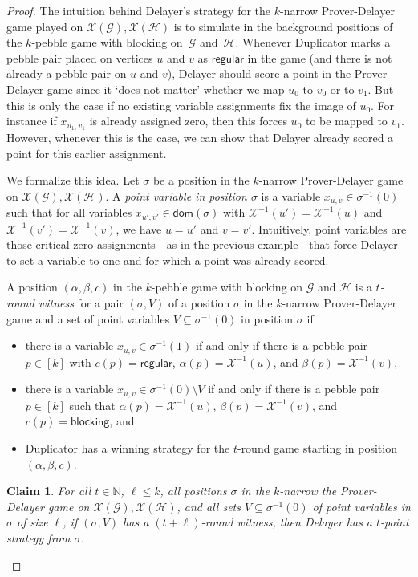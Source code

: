 \documentclass[10pt,a4paper]{article}
\newcommand{\defining}[1]{\emph{#1}}
\newcommand{\regular}{\mathsf{regular}}
\newcommand{\blocking}{\mathsf{blocking}}
\newcommand{\inv}[1]{#1^{-1}}
\newcommand{\graphG}{\mathcal{G}}
\newcommand{\graphH}{\mathcal{H}}
\newcommand{\dom}{\mathsf{dom}}
\newcommand{\graphXG}{\mathcal{X}(\mathcal{G})}
\newcommand{\graphXH}{\mathcal{X}(\mathcal{H})}
\newcommand{\X}{\mathcal{X}}
\newcommand{\XI}{\X^{-1}}
\newtheorem{claim}[theorem]{Claim}
\begin{document}
%
\begin{proof}
The intuition behind Delayer's strategy for the $k$-narrow Prover-Delayer game played on $\graphXG,\graphXH$ is to 
simulate in the background positions of the $k$-pebble game with blocking on~$\graphG$ and~$\graphH$.
Whenever Duplicator marks a pebble pair placed on vertices $u$ and $v$ as $\regular$ in the game
(and there is not already a pebble pair on $u$ and $v$),
Delayer should score a point in the Prover-Delayer game since it `does not matter' whether we map $u_0$ to $v_0$ or to $v_1$.
But this is only the case if no existing variable assignments fix the image of $u_0$. For instance if $x_{u_1,v_1}$ is already assigned zero, then this forces $u_0$ to be mapped to $v_1$. However, whenever this is the case, we can show that Delayer already scored a point for this earlier assignment.

We formalize this idea.
Let $\sigma$ be a position in the $k$-narrow 
Prover-Delayer game on $\graphXG, \graphXH$.
A \defining{point variable in position $\sigma$} is a variable $x_{u,v} \in \inv{\sigma}(0)$ such that
for all variables $x_{u',v'} \in \dom(\sigma)$ with $\XI(u') = \XI(u)$ and $\XI(v') = \XI(v)$, we have $u=u'$ and $v=v'$.
Intuitively, point variables are those critical zero assignments---as in the previous example---that force Delayer to set a variable to one and for which a point was already scored. 

A position $(\alpha,\beta,c)$ in the $k$-pebble game with blocking on $\graphG$ and $\graphH$ is a \defining{$t$-round witness} for
a pair $(\sigma, V)$ of a position $\sigma$ in the $k$-narrow Prover-Delayer game and a set of point variables $V \subseteq \sigma^{-1}(0)$ in position $\sigma$ if
\begin{itemize}
        \item there is a variable $x_{u,v} \in \sigma^{-1}(1)$ if and only if
        there is a pebble pair $p \in [k]$ with $c(p) = \regular$, $\alpha(p) = \XI(u)$, and $\beta(p) = \XI(v)$,
        \item there is a variable  $x_{u,v} \in \sigma^{-1}(0)\setminus V$ if and only if
        there is a pebble pair $p \in [k]$ such that $\alpha(p) = \XI(u)$, $\beta(p) = \XI(v)$, and $c(p) = \blocking$, and
        \item Duplicator has a winning strategy for the $t$-round game starting in position $(\alpha, \beta,c)$. 
\end{itemize}

\begin{claim} \label{claim: witness_implies_points} For all $t \in \mathbb{N}$, $\ell \leq k$, all positions $\sigma$ in the $k$-narrow the Prover-Delayer
game on $\graphXG, \graphXH$, and all sets $V\subseteq \inv{\sigma}(0)$ of point variables in $\sigma$ of size $\ell$,
 if $(\sigma, V)$ has a $(t+\ell)$-round witness, 
then
Delayer has a $t$-point strategy from $\sigma$.
\end{claim}


\end{proof}
\end{document}
